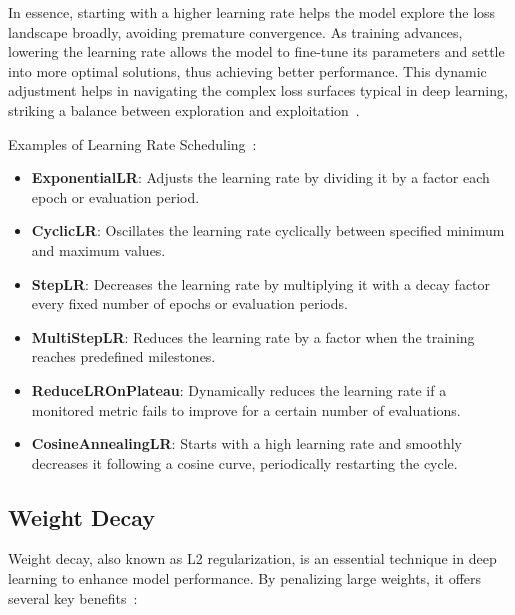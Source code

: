 \documentclass[12pt,a4paper]{report}
\begin{document}
In essence, starting with a higher learning rate helps the model explore the loss landscape broadly, avoiding premature convergence. As training advances, lowering the learning rate allows the model to fine-tune its parameters and settle into more optimal solutions, thus achieving better performance. This dynamic adjustment helps in navigating the complex loss surfaces typical in deep learning, striking a balance between exploration and exploitation~\cite{learningrate}.

Examples of Learning Rate Scheduling~\cite{learningrate2}:

\begin{itemize}
  \item \textbf{ExponentialLR}: Adjusts the learning rate by dividing it by a factor each epoch or evaluation period.
  \item \textbf{CyclicLR}: Oscillates the learning rate cyclically between specified minimum and maximum values.
  \item \textbf{StepLR}: Decreases the learning rate by multiplying it with a decay factor every fixed number of epochs or evaluation periods.
  \item \textbf{MultiStepLR}: Reduces the learning rate by a factor when the training reaches predefined milestones.
  \item \textbf{ReduceLROnPlateau}: Dynamically reduces the learning rate if a monitored metric fails to improve for a certain number of evaluations.
  \item \textbf{CosineAnnealingLR}: Starts with a high learning rate and smoothly decreases it following a cosine curve, periodically restarting the cycle.
\end{itemize}

\subsection{Weight Decay}
Weight decay, also known as L2 regularization, is an essential technique in deep learning to enhance model performance. By penalizing large weights, it offers several key benefits~\cite{weightdecay}:
\end{document}
